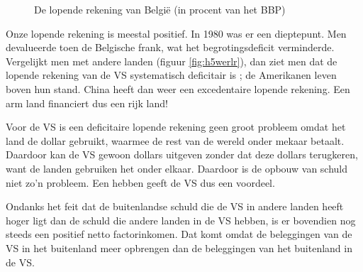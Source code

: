 \begin{figure}[H]
\small\centering\captionsetup{justification=centering,margin=2cm}
\caption{De lopende rekening van Belgi\"e (in procent van het BBP)}
\label{fig:h5bellr}
\end{figure}

Onze lopende rekening is meestal positief. In 1980 was er een dieptepunt. Men devalueerde toen de Belgische frank, wat het begrotingsdeficit verminderde. Vergelijkt men met andere landen (figuur \ref{fig:h5werlr}), dan ziet men dat de lopende rekening van de VS systematisch deficitair is ; de Amerikanen leven boven hun stand. China heeft dan weer een excedentaire lopende rekening. Een arm land financiert dus een rijk land!\\

\par Voor de VS is een deficitaire lopende rekening geen groot probleem omdat het land de dollar gebruikt, waarmee de rest van de wereld onder mekaar betaalt. Daardoor kan de VS gewoon dollars uitgeven zonder dat deze dollars terugkeren, want de landen gebruiken het onder elkaar. Daardoor is de opbouw van schuld niet zo'n probleem. Een  hebben geeft de VS dus een voordeel.
\par Ondanks het feit dat de buitenlandse schuld die de VS in andere landen heeft hoger ligt dan de schuld die andere landen in de VS hebben, is er bovendien nog steeds een positief netto factorinkomen. Dat komt omdat de beleggingen van de VS in het buitenland meer opbrengen dan de beleggingen van het buitenland in de VS.

